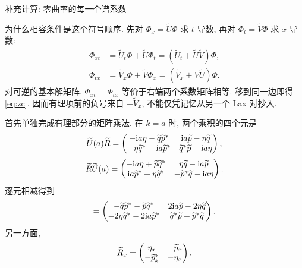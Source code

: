 \par\medskip\noindent 补充计算: 零曲率的每一个谱系数\par
\par\smallskip\noindent 为什么相容条件是这个符号顺序.\quad
先对 $\Phi_x=\widetilde U\Phi$ 求 $t$ 导数, 再对 $\Phi_t=\widetilde V\Phi$ 求 $x$ 导数:
\begin{align*}
\Phi_{xt}&=\widetilde U_t\Phi+\widetilde U\Phi_t
=(\widetilde U_t+\widetilde U\widetilde V)\Phi,\\
\Phi_{tx}&=\widetilde V_x\Phi+\widetilde V\Phi_x
=(\widetilde V_x+\widetilde V\widetilde U)\Phi.
\end{align*}
对可逆的基本解矩阵, $\Phi_{xt}=\Phi_{tx}$ 等价于右端两个系数矩阵相等. 移到同一边即得 \eqref{eq:zc}. 因而有理项前的负号来自 $-\widetilde V_x$, 不能仅凭记忆从另一个 Lax 对抄入.
\par\smallskip\noindent 首先单独完成有理部分的矩阵乘法.\quad
在 $k=a$ 时, 两个乘积的四个元是
\begin{equation*}
\widetilde U(a)\widetilde R=
\begin{pmatrix}
-\mathrm{i} a\eta-\widetilde q{\widetilde p}^{*}
&\mathrm{i} a\widetilde p-\eta\widetilde q\\
-\eta{\widetilde q}^{*}-\mathrm{i} a{\widetilde p}^{*}
&{\widetilde q}^{*}\widetilde p-\mathrm{i} a\eta
\end{pmatrix},
\end{equation*}
\begin{equation*}
\widetilde R\widetilde U(a)=
\begin{pmatrix}
-\mathrm{i} a\eta+\widetilde p{\widetilde q}^{*}
&\eta\widetilde q-\mathrm{i} a\widetilde p\\
\mathrm{i} a{\widetilde p}^{*}+\eta{\widetilde q}^{*}
&-{\widetilde p}^{*}\widetilde q-\mathrm{i} a\eta
\end{pmatrix}.
\end{equation*}
逐元相减得到
\begin{equation*}
[\widetilde U(a),\widetilde R]=
\begin{pmatrix}
-\widetilde q\conj{\widetilde p}-\widetilde p\conj{\widetilde q}
&2\ii a\widetilde p-2\eta\widetilde q\\
-2\eta\conj{\widetilde q}-2\ii a\conj{\widetilde p}
&\conj{\widetilde q}\widetilde p+\conj{\widetilde p}\widetilde q
\end{pmatrix}.
\end{equation*}
另一方面,
\begin{equation*}
\widetilde R_x=
\begin{pmatrix}
\eta_x&-\widetilde p_x\\
-{\widetilde p_x}^{*}&-\eta_x
\end{pmatrix}.
\end{equation*}
